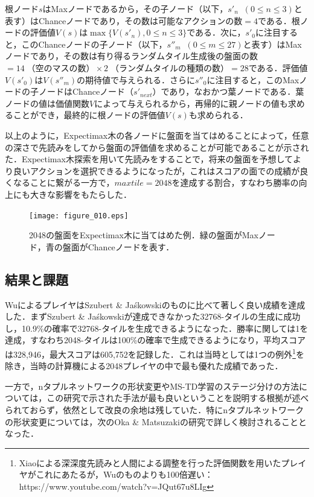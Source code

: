 \documentclass{suribt}
\begin{document}
根ノード$s$はMaxノードであるから，その子ノード（以下，$s'_n \;\; (0 \leq n \leq 3)$と表す）はChanceノードであり，その数は可能なアクションの数$=4$である．根ノードの評価値$V(s)$は$\max\{V(s'_n), 0 \leq n \leq 3\}$である．次に，$s'_0$に注目すると，このChanceノードの子ノード（以下，$s''_m \;\; (0 \leq m \leq 27)$と表す）はMaxノードであり，その数は有り得るランダムタイル生成後の盤面の数$=14 \; \text{（空のマスの数）} \times 2 \; \text{（ランダムタイルの種類の数）} = 28$である．評価値$V(s'_0)$は$V(s''_m)$の期待値で与えられる．さらに$s''_0$に注目すると，このMaxノードの子ノードはChanceノード（$s'_{next}$）であり，なおかつ葉ノードである．葉ノードの値は価値関数$V$によって与えられるから，再帰的に親ノードの値も求めることができ，最終的に根ノードの評価値$V(s)$も求められる．

以上のように，Expectimax木の各ノードに盤面を当てはめることによって，任意の深さで先読みをしてから盤面の評価値を求めることが可能であることが示された．Expectimax木探索を用いて先読みをすることで，将来の盤面を予想してより良いアクションを選択できるようになったが，これはスコアの面での成績が良くなることに繋がる一方で，$maxtile=2048$を達成する割合，すなわち勝率の向上にも大きな影響をもたらした．

\begin{figure}[t]
	\begin{center}
	\texttt{[image: figure\_010.eps]}
	\caption{2048の盤面をExpectimax木に当てはめた例．緑の盤面がMaxノード，青の盤面がChanceノードを表す．}
	\label{figure_010}
	\end{center}
\end{figure}

\subsection{結果と課題}
WuによるプレイヤはSzubert \& Ja\'{s}kowskiのものに比べて著しく良い成績を達成した．まずSzubert \& Ja\'{s}kowskiが達成できなかった32768-タイルの生成に成功し，10.9\%の確率で32768-タイルを生成できるようになった．勝率に関しては1を達成，すなわち2048-タイルは100\%の確率で生成できるようになり，平均スコアは328,946，最大スコアは605,752を記録した．これは当時としては1つの例外\footnote{Xiaoによる深深度先読みと人間による調整を行った評価関数を用いたプレイヤがこれにあたるが，Wuのものよりも100倍遅い：https://www.youtube.com/watch?v=JQut67u8LIg}を除き，当時の計算機による2048プレイヤの中で最も優れた成績であった．

一方で，nタプルネットワークの形状変更やMS-TD学習のステージ分けの方法については，この研究で示された手法が最も良いということを説明する根拠が述べられておらず，依然として改良の余地は残していた．特にnタプルネットワークの形状変更については，次のOka \& Matsuzakiの研究で詳しく検討されることとなった．
\end{document}
